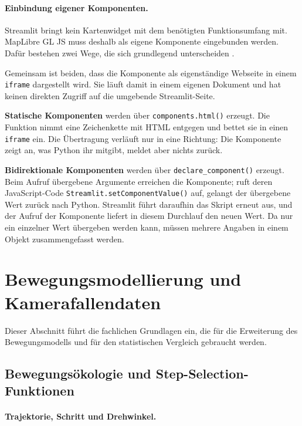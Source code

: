\documentclass[12pt,a4paper]{report}
\begin{document}
\paragraph{Einbindung eigener Komponenten.}
\label{par:komponenten}

Streamlit bringt kein Kartenwidget mit dem benötigten Funktionsumfang mit. MapLibre GL JS
muss deshalb als eigene Komponente eingebunden werden. Dafür bestehen zwei Wege, die sich
grundlegend unterscheiden \cite{StreamlitComponents}.

Gemeinsam ist beiden, dass die Komponente als eigenständige Webseite in einem
\texttt{iframe} dargestellt wird. Sie läuft damit in einem eigenen Dokument und hat keinen
direkten Zugriff auf die umgebende Streamlit-Seite.

\textbf{Statische Komponenten} werden über \texttt{components.html()} erzeugt. Die Funktion
nimmt eine Zeichenkette mit HTML entgegen und bettet sie in einen \texttt{iframe} ein. Die
Übertragung verläuft nur in eine Richtung: Die Komponente zeigt an, was Python ihr
mitgibt, meldet aber nichts zurück.

\textbf{Bidirektionale Komponenten} werden über \texttt{declare\_component()} erzeugt. Beim
Aufruf übergebene Argumente erreichen die Komponente; ruft deren JavaScript-Code
\texttt{Streamlit.setComponentValue()} auf, gelangt der übergebene Wert zurück nach
Python. Streamlit führt daraufhin das Skript erneut aus, und der Aufruf der Komponente
liefert in diesem Durchlauf den neuen Wert. Da nur ein einzelner Wert übergeben werden
kann, müssen mehrere Angaben in einem Objekt zusammengefasst werden.


\section{Bewegungsmodellierung und Kamerafallendaten}
\label{sec:fachliche-grundlagen}

Dieser Abschnitt führt die fachlichen Grundlagen ein, die für die Erweiterung des
Bewegungsmodells und für den statistischen Vergleich gebraucht werden.

\subsection{Bewegungsökologie und Step-Selection-Funktionen}
\label{subsec:bewegungsoekologie}


\paragraph{Trajektorie, Schritt und Drehwinkel.}
\end{document}
